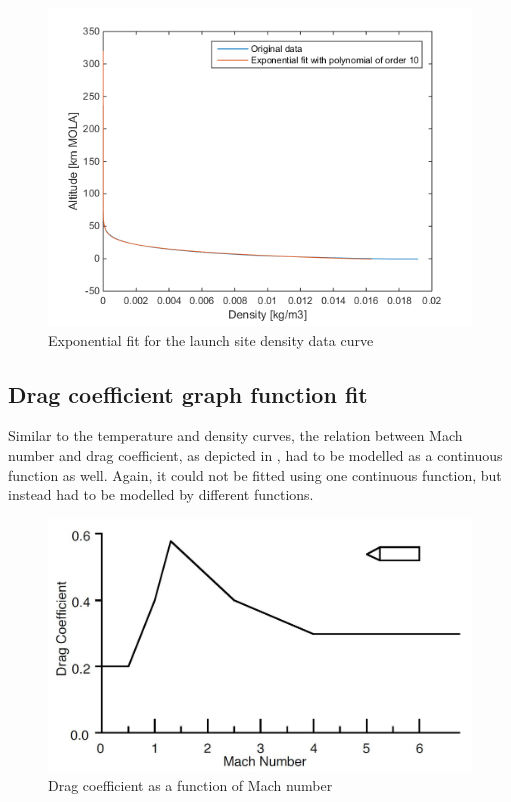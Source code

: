 \begin{figure}[!ht]
\centering
\includegraphics[width=1.0\textwidth]{figures/software/completeExpFitDen.png}
\caption{Exponential fit for the launch site density data curve}
\label{fig:completeExpFitDen}
\end{figure}



\subsection{Drag coefficient graph function fit}
\label{subsec:dragCoefFuncFit}
Similar to the temperature and density curves, the relation between Mach number and drag coefficient, as depicted in , had to be modelled as a continuous function as well. Again, it could not be fitted using one continuous function, but instead had to be modelled by different functions.

\begin{figure}[!ht]
\centering
\includegraphics[width=1.0\textwidth]{figures/launcher_methods/dragcoeff_whitehead2004mars.jpg}
\caption{Drag coefficient as a function of Mach number \cite{whitehead2004mars}}
\label{fig:dragcoeff_whitehead2004mars}
\end{figure}

